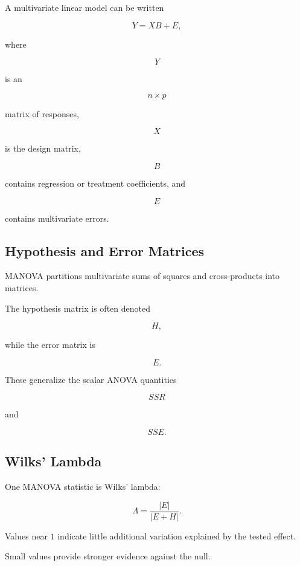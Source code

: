 A multivariate linear model can be written

\[
\boxed{
Y
=
XB+E,
}
\]

where

\[
Y
\]

is an

\[
n\times p
\]

matrix of responses,

\[
X
\]

is the design matrix,

\[
B
\]

contains regression or treatment coefficients, and

\[
E
\]

contains multivariate errors.

\subsection{Hypothesis and Error Matrices}
\label{subsec:manova-h-e-matrices}

MANOVA partitions multivariate sums of squares and cross-products into
matrices.

The hypothesis matrix is often denoted

\[
\boxed{
H,
}
\]

while the error matrix is

\[
\boxed{
E.
}
\]

These generalize the scalar ANOVA quantities

\[
SSR
\]

and

\[
SSE.
\]

\subsection{Wilks' Lambda}
\label{subsec:wilks-lambda-manova}

One MANOVA statistic is Wilks' lambda:

\[
\boxed{
\Lambda
=
\frac{
|E|
}{
|E+H|
}.
}
\]

Values near \(1\) indicate little additional variation explained by the
tested effect.

Small values provide stronger evidence against the null.

